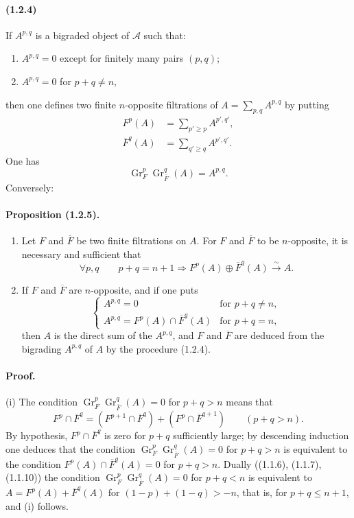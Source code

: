 \documentclass[10pt]{article}
\newcommand{\Gr}{\operatorname{Gr}}
\newcommand{\calA}{\mathcal A}
\newcommand{\iso}{\xrightarrow{\sim}}
\begin{document}
\paragraph{(1.2.4)} If $A^{p,q}$ is a bigraded object of $\calA$ such that:
\begin{enumerate}[label=\alph*)]
\item $A^{p,q}=0$ except for finitely many pairs $(p,q)$;
\item $A^{p,q}=0$ for $p+q\ne n$,
\end{enumerate}
then one defines two finite $n$-opposite filtrations of $A=\sum_{p,q}A^{p,q}$ by putting
\begin{align}
F^p(A)&=\sum_{p'\ge p} A^{p',q'}, \tag{1.2.4.1}\\
\overline F^q(A)&=\sum_{q'\ge q} A^{p',q'}. \tag{1.2.4.2}
\end{align}
One has
\[
\tag{1.2.4.3}
\Gr_F^p\Gr_{\overline F}^{q}(A)=A^{p,q}.
\]
Conversely:

\paragraph{Proposition (1.2.5).} \begin{enumerate}[label=(\roman*)]
\item Let $F$ and $\overline F$ be two finite filtrations on $A$. For $F$ and $\overline F$ to be $n$-opposite, it is necessary and sufficient that
\[
\forall p,q\qquad p+q=n+1\Rightarrow F^p(A)\oplus\overline F^q(A)\iso A.
\]
\item If $F$ and $\overline F$ are $n$-opposite, and if one puts
\[
\begin{cases}
A^{p,q}=0 & \text{for }p+q\ne n,\\
A^{p,q}=F^p(A)\cap\overline F^q(A) & \text{for }p+q=n,
\end{cases}
\]
then $A$ is the direct sum of the $A^{p,q}$, and $F$ and $\overline F$ are deduced from the bigrading $A^{p,q}$ of $A$ by the procedure (1.2.4).
\end{enumerate}

\paragraph{Proof.} (i) The condition $\Gr_F^p\Gr_{\overline F}^q(A)=0$ for $p+q>n$ means that
\[
F^p\cap\overline F^q=(F^{p+1}\cap\overline F^q)+(F^p\cap\overline F^{q+1})\qquad(p+q>n).
\]
By hypothesis, $F^p\cap\overline F^q$ is zero for $p+q$ sufficiently large; by descending induction one deduces that the condition $\Gr_F^p\Gr_{\overline F}^q(A)=0$ for $p+q>n$ is equivalent to the condition $F^p(A)\cap\overline F^q(A)=0$ for $p+q>n$. Dually ((1.1.6), (1.1.7), (1.1.10)) the condition $\Gr_F^p\Gr_{\overline F}^q(A)=0$ for $p+q<n$ is equivalent to $A=F^p(A)+\overline F^q(A)$ for $(1-p)+(1-q)>-n$, that is, for $p+q\le n+1$, and (i) follows.
\end{document}
